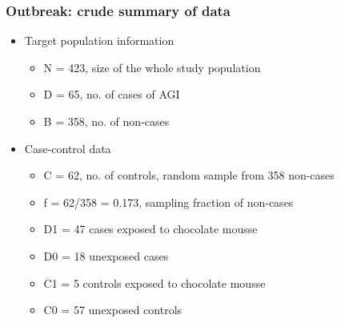 \documentclass[handout,12pt,dvipsnames,t]{beamer}
\begin{document}
\begin{frame}[fragile]
\frametitle{Outbreak: crude summary of data}

\begin{itemize}
\item Target population information
 \begin{itemize}
  \item N = 423, size of the whole study population
  \item D = 65, no. of cases of AGI
  \item B = 358, no. of non-cases
 \end{itemize}
\item Case-control data
\begin{itemize}
\item  C = 62, no. of controls, random sample from 358 non-cases
\item  f = 62/358 = 0.173, sampling fraction of non-cases
\item  D1 = 47 cases exposed to chocolate mousse
\item  D0 = 18 unexposed cases
\item  C1 = 5 controls exposed to chocolate mousse
\item  C0 = 57 unexposed controls
\end{itemize}
\end{itemize}

\end{frame}
\end{document}
